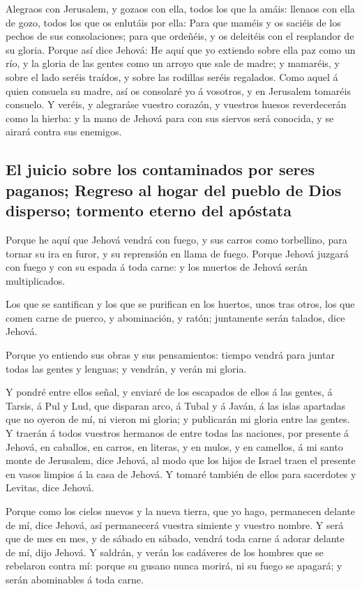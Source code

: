  Alegraos con Jerusalem, y gozaos con ella, todos los que
la amáis: llenaos con ella de gozo, todos los que os enlutáis por ella:
 Para que maméis y os saciéis de los pechos de sus
consolaciones; para que ordeñéis, y os deleitéis con el resplandor de su
gloria.  Porque así dice Jehová: He aquí que yo extiendo
sobre ella paz como un río, y la gloria de las gentes como un arroyo que
sale de madre; y mamaréis, y sobre el lado seréis traídos, y sobre las
rodillas seréis regalados.  Como aquel á quien consuela su
madre, así os consolaré yo á vosotros, y en Jerusalem tomaréis consuelo.
 Y veréis, y alegraráse vuestro corazón, y vuestros huesos
reverdecerán como la hierba: y la mano de Jehová para con sus siervos
será conocida, y se airará contra sus enemigos.

\hypertarget{el-juicio-sobre-los-contaminados-por-seres-paganos-regreso-al-hogar-del-pueblo-de-dios-disperso-tormento-eterno-del-apuxf3stata}{%
\subsection{El juicio sobre los contaminados por seres paganos; Regreso
al hogar del pueblo de Dios disperso; tormento eterno del
apóstata}\label{el-juicio-sobre-los-contaminados-por-seres-paganos-regreso-al-hogar-del-pueblo-de-dios-disperso-tormento-eterno-del-apuxf3stata}}

 Porque he aquí que Jehová vendrá con fuego, y sus carros
como torbellino, para tornar su ira en furor, y su reprensión en llama
de fuego.  Porque Jehová juzgará con fuego y con su espada
á toda carne: y los muertos de Jehová serán multiplicados.

 Los que se santifican y los que se purifican en los
huertos, unos tras otros, los que comen carne de puerco, y abominación,
y ratón; juntamente serán talados, dice Jehová.

 Porque yo entiendo sus obras y sus pensamientos: tiempo
vendrá para juntar todas las gentes y lenguas; y vendrán, y verán mi
gloria.

 Y pondré entre ellos señal, y enviaré de los escapados de
ellos á las gentes, á Tarsis, á Pul y Lud, que disparan arco, á Tubal y
á Javán, á las islas apartadas que no oyeron de mí, ni vieron mi gloria;
y publicarán mi gloria entre las gentes.  Y traerán á todos
vuestros hermanos de entre todas las naciones, por presente á Jehová, en
caballos, en carros, en literas, y en mulos, y en camellos, á mi santo
monte de Jerusalem, dice Jehová, al modo que los hijos de Israel traen
el presente en vasos limpios á la casa de Jehová.  Y tomaré
también de ellos para sacerdotes y Levitas, dice Jehová.

 Porque como los cielos nuevos y la nueva tierra, que yo
hago, permanecen delante de mí, dice Jehová, así permanecerá vuestra
simiente y vuestro nombre.  Y será que de mes en mes, y de
sábado en sábado, vendrá toda carne á adorar delante de mí, dijo Jehová.
 Y saldrán, y verán los cadáveres de los hombres que se
rebelaron contra mí: porque su gusano nunca morirá, ni su fuego se
apagará; y serán abominables á toda carne.
